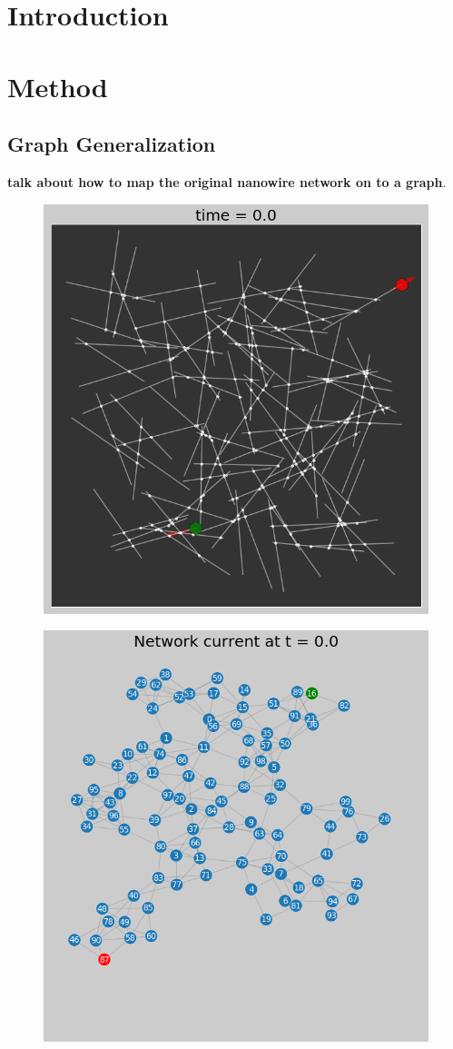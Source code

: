 \documentclass[%
 reprint,
 amsmath,amssymb,
 aps,
]{revtex4-2}
\begin{document}

\section{\label{sec:level1}  Introduction}
\section{\label{sec:level1} Method}

\subsection{Graph Generalization}

\textbf{talk about how to map the original nanowire network on to a graph}.

\begin{figure}[h]
	\centering
	\includegraphics[width=0.7\linewidth]{figure/mpl_plot}
	\caption{}
	\label{fig:mpl_plot}
\end{figure}

\begin{figure}[h]
	\centering
	\includegraphics[width=0.8\linewidth]{figure/graph_plot}
	\caption{}
	\label{fig:graph_plot}
\end{figure}
\end{document}
